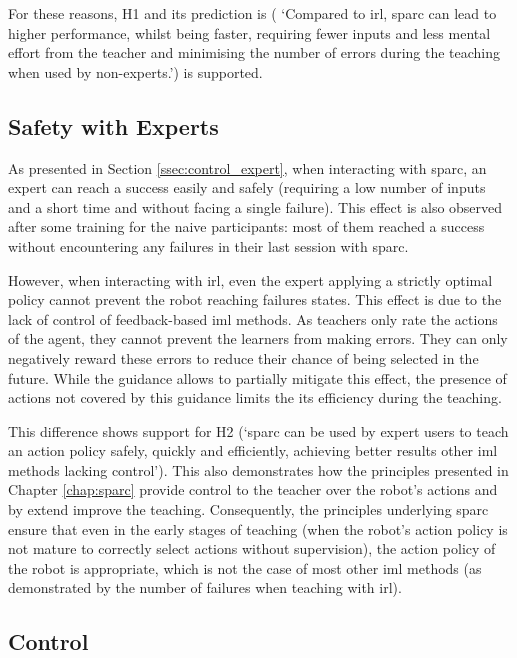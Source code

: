 For these reasons, H1 and its prediction is ( `Compared to \gls{irl}, \gls{sparc} can lead to higher performance, whilst being faster, requiring fewer inputs and less mental effort from the teacher and minimising the number of errors during the teaching when used by non-experts.') is supported.

\subsection{Safety with Experts}

As presented in Section \ref{ssec:control_expert}, when interacting with \gls{sparc}, an expert can reach a success easily and safely (requiring a low number of inputs and a short time and without facing a single failure). This effect is also observed after some training for the naive participants: most of them reached a success without encountering any failures in their last session with \gls{sparc}.

However, when interacting with \gls{irl}, even the expert applying a strictly optimal policy cannot prevent the robot reaching failures states. This effect is due to the lack of control of feedback-based \gls{iml} methods. As teachers only rate the actions of the agent, they cannot prevent the learners from making errors. They can only negatively reward these errors to reduce their chance of being selected in the future. While the guidance allows to partially mitigate this effect, the presence of actions not covered by this guidance limits the its efficiency during the teaching.

This difference shows support for H2 (`\gls{sparc} can be used by expert users to teach an action policy safely, quickly and efficiently, achieving better results other \gls{iml} methods lacking control'). This also demonstrates how the principles presented in Chapter \ref{chap:sparc} provide control to the teacher over the robot's actions and by extend improve the teaching. Consequently, the principles underlying \gls{sparc} ensure that even in the early stages of teaching (when the robot's action policy is not mature to correctly select actions without supervision), the action policy of the robot is appropriate, which is not the case of most other \gls{iml} methods (as demonstrated by the number of failures when teaching with \gls{irl}).

\subsection{Control}
\label{ssec:control_control}

